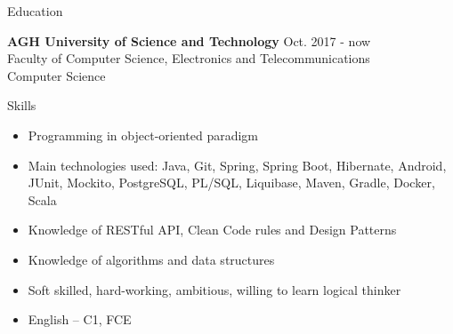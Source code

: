 \documentclass{resume} %
\begin{document}

\begin{rSection}{Education}

{\bf AGH University of Science and Technology} \hfill {Oct. 2017 - now}
\\ Faculty of Computer Science, Electronics and Telecommunications
\\ Computer Science

\end{rSection}


\begin{rSection}{Skills}
\begin{itemize}
 \setlength\itemsep{-0.5em}
\item Programming in object-oriented paradigm
\item Main technologies used: Java, Git, Spring, Spring Boot, Hibernate, Android, JUnit, Mockito, PostgreSQL, PL/SQL, Liquibase, Maven, Gradle, Docker, Scala
\item Knowledge of RESTful API, Clean Code rules and Design Patterns
\item Knowledge of algorithms and data structures
\item Soft skilled, hard-working, ambitious, willing to learn logical thinker
\item English – C1, FCE
\end{itemize}
\end{rSection}


\end{document}
